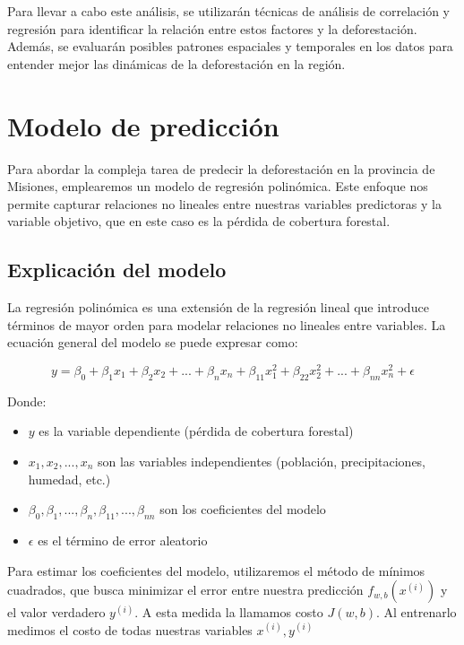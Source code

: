 \documentclass[11pt]{article}
\begin{document}
Para llevar a cabo este análisis, se utilizarán técnicas de análisis de correlación y regresión para identificar la relación entre estos factores y la deforestación. Además, se evaluarán posibles patrones espaciales y temporales en los datos para entender mejor las dinámicas de la deforestación en la región.


\section{Modelo de predicción}

Para abordar la compleja tarea de predecir la deforestación en la provincia de Misiones, emplearemos un modelo de regresión polinómica. Este enfoque nos permite capturar relaciones no lineales entre nuestras variables predictoras y la variable objetivo, que en este caso es la pérdida de cobertura forestal.

\subsection{Explicación del modelo}

La regresión polinómica es una extensión de la regresión lineal que introduce términos de mayor orden para modelar relaciones no lineales entre variables. La ecuación general del modelo se puede expresar como:

\begin{equation}
y = \beta_0 + \beta_1x_1 + \beta_2x_2 + ... + \beta_nx_n + \beta_{11}x_1^2 + \beta_{22}x_2^2 + ... + \beta_{nn}x_n^2 + \epsilon
\end{equation}

Donde:
\begin{itemize}
\item $y$ es la variable dependiente (pérdida de cobertura forestal)
\item $x_1, x_2, ..., x_n$ son las variables independientes (población, precipitaciones, humedad, etc.)
\item $\beta_0, \beta_1, ..., \beta_n, \beta_{11}, ..., \beta_{nn}$ son los coeficientes del modelo
\item $\epsilon$ es el término de error aleatorio
\end{itemize}

Para estimar los coeficientes del modelo, utilizaremos el método de mínimos cuadrados, que busca minimizar el error entre nuestra predicción $f_{w,b}(x^{(i)})$ y el valor verdadero $y^{(i)}$. A esta medida la llamamos costo $J(w,b)$. Al entrenarlo medimos el costo de todas nuestras variables  $x^{(i)},y^{(i)}$
\end{document}
